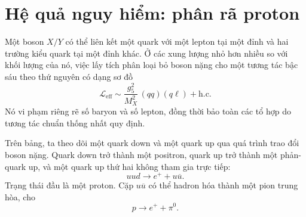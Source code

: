 \begin{classroomqa}
\end{classroomqa}

\begin{classroomqa}
\end{classroomqa}

\section{Hệ quả nguy hiểm: phân rã proton}

Một boson \(X/Y\) có thể liên kết một quark với một lepton tại một đỉnh và hai trường kiểu quark tại một đỉnh khác. Ở các xung lượng nhỏ hơn nhiều so với khối lượng của nó, việc lấy tích phân loại bỏ boson nặng cho một tương tác bậc sáu theo thứ nguyên có dạng sơ đồ
\begin{equation}
\mathcal L_{\mathrm{eff}}
\sim
\frac{g_5^2}{M_X^2}\,(qq)(q\ell)
+\text{h.c.}
\label{eq:l10-effective-proton}
\end{equation}
Nó vi phạm riêng rẽ số baryon và số lepton, đồng thời bảo toàn các tổ hợp do tương tác chuẩn thống nhất quy định.

Trên bảng, ta theo dõi một quark down và một quark up qua quá trình trao đổi boson nặng. Quark down trở thành một positron, quark up trở thành một phản-quark up, và một quark up thứ hai không tham gia trực tiếp:
\begin{equation}
uud
\longrightarrow
e^++u\overline u.
\label{eq:l10-quark-decay}
\end{equation}
Trạng thái đầu là một proton. Cặp \(u\overline u\) có thể hadron hóa thành một pion trung hòa, cho
\begin{equation}
p\longrightarrow e^++\pi^0.
\label{eq:l10-proton-pion}
\end{equation}

